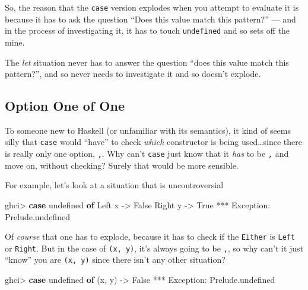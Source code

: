 \documentclass[]{article}
\newenvironment{Shaded}{}{}
\newcommand{\DataTypeTok}[1]{\textcolor[rgb]{0.56,0.13,0.00}{#1}}
\newcommand{\FunctionTok}[1]{\textcolor[rgb]{0.02,0.16,0.49}{#1}}
\newcommand{\KeywordTok}[1]{\textcolor[rgb]{0.00,0.44,0.13}{\textbf{#1}}}
\newcommand{\NormalTok}[1]{#1}
\newcommand{\OperatorTok}[1]{\textcolor[rgb]{0.40,0.40,0.40}{#1}}
\newcommand{\OtherTok}[1]{\textcolor[rgb]{0.00,0.44,0.13}{#1}}
\begin{document}
So, the reason that the \texttt{case} version explodes when you attempt to
evaluate it is because it has to ask the question ``Does this value match this
pattern?'' --- and in the process of investigating it, it has to touch
\texttt{undefined} and so sets off the mine.

The \emph{let} situation never has to answer the question ``does this value
match this pattern?'', and so never needs to investigate it and so doesn't
explode.

\hypertarget{option-one-of-one}{%
\subsection{Option One of One}\label{option-one-of-one}}

To someone new to Haskell (or unfamiliar with its semantics), it kind of seems
silly that \texttt{case} would ``have'' to check \emph{which} constructor is
being used\ldots since there is really only one option, \texttt{,}. Why can't
\texttt{case} just know that it \emph{has} to be \texttt{,} and move on, without
checking? Surely that would be more sensible.

For example, let's look at a situation that is uncontroversial

\begin{Shaded}
\begin{Highlighting}[]
\NormalTok{ghci}\OperatorTok{>} \KeywordTok{case} \FunctionTok{undefined} \KeywordTok{of}
        \DataTypeTok{Left}\NormalTok{ x }\OtherTok{{-}>} \DataTypeTok{False}
        \DataTypeTok{Right}\NormalTok{ y }\OtherTok{{-}>} \DataTypeTok{True}
\OperatorTok{***} \DataTypeTok{Exception}\OperatorTok{:}\NormalTok{ Prelude.undefined}
\end{Highlighting}
\end{Shaded}

Of \emph{course} that one has to explode, because it has to check if the
\texttt{Either} is \texttt{Left} or \texttt{Right}. But in the case of
\texttt{(x,\ y)}, it's always going to be \texttt{,}, so why can't it just
``know'' you are \texttt{(x,\ y)} since there isn't any other situation?

\begin{Shaded}
\begin{Highlighting}[]
\NormalTok{ghci}\OperatorTok{>} \KeywordTok{case} \FunctionTok{undefined} \KeywordTok{of}
\NormalTok{        (x, y) }\OtherTok{{-}>} \DataTypeTok{False}
\OperatorTok{***} \DataTypeTok{Exception}\OperatorTok{:}\NormalTok{ Prelude.undefined}
\end{Highlighting}
\end{Shaded}
\end{document}
